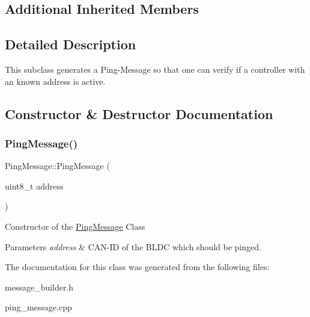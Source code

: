 \subsection*{Additional Inherited Members}


\subsection{Detailed Description}
This subclass generates a Ping-\/\+Message so that one can verify if a controller with an known address is active. 

\subsection{Constructor \& Destructor Documentation}
\mbox{\label{classPingMessage_a67d49a8189b481cf1d39460a90ab5be7}} 
\subsubsection{\texorpdfstring{Ping\+Message()}{PingMessage()}}
{\footnotesize\ttfamily Ping\+Message\+::\+Ping\+Message (\begin{DoxyParamCaption}\item[{uint8\+\_\+t}]{address }\end{DoxyParamCaption})}

Constructor of the \hyperlink{classPingMessage}{Ping\+Message} Class 
\begin{DoxyParams}{Parameters}
{\em address} & C\+A\+N-\/\+ID of the B\+L\+DC which should be pinged. \\
\hline
\end{DoxyParams}


The documentation for this class was generated from the following files\+:\begin{DoxyCompactItemize}
\item 
message\+\_\+builder.\+h\item 
ping\+\_\+message.\+cpp\end{DoxyCompactItemize}

